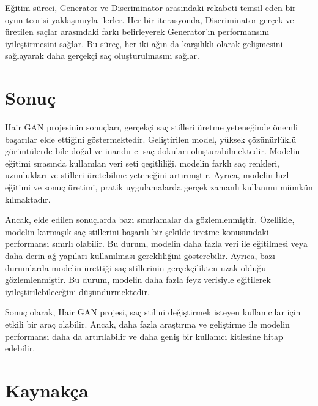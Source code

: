 \documentclass[12pt]{article}
\begin{document}
Eğitim süreci, Generator ve Discriminator arasındaki rekabeti temsil eden bir oyun teorisi yaklaşımıyla ilerler. Her bir iterasyonda, Discriminator gerçek ve üretilen saçlar arasındaki farkı belirleyerek Generator'ın performansını iyileştirmesini sağlar. Bu süreç, her iki ağın da karşılıklı olarak gelişmesini sağlayarak daha gerçekçi saç oluşturulmasını sağlar.

\section{Sonuç}
Hair GAN projesinin sonuçları, gerçekçi saç stilleri üretme yeteneğinde önemli başarılar elde ettiğini göstermektedir. Geliştirilen model, yüksek çözünürlüklü görüntülerde bile doğal ve inandırıcı saç dokuları oluşturabilmektedir. Modelin eğitimi sırasında kullanılan veri seti çeşitliliği, modelin farklı saç renkleri, uzunlukları ve stilleri üretebilme yeteneğini artırmıştır. Ayrıca, modelin hızlı eğitimi ve sonuç üretimi, pratik uygulamalarda gerçek zamanlı kullanımı mümkün kılmaktadır.

Ancak, elde edilen sonuçlarda bazı sınırlamalar da gözlemlenmiştir. Özellikle, modelin karmaşık saç stillerini başarılı bir şekilde üretme konusundaki performansı sınırlı olabilir. Bu durum, modelin daha fazla veri ile eğitilmesi veya daha derin ağ yapıları kullanılması gerekliliğini gösterebilir. Ayrıca, bazı durumlarda modelin ürettiği saç stillerinin gerçekçilikten uzak olduğu gözlemlenmiştir. Bu durum, modelin daha fazla feyz verisiyle eğitilerek iyileştirilebileceğini düşündürmektedir.

Sonuç olarak, Hair GAN projesi, saç stilini değiştirmek isteyen kullanıcılar için etkili bir araç olabilir. Ancak, daha fazla araştırma ve geliştirme ile modelin performansı daha da artırılabilir ve daha geniş bir kullanıcı kitlesine hitap edebilir.
\section{Kaynakça}

\printbibliography
\end{document}
